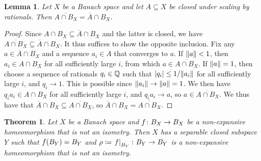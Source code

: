 \documentclass{amsart}
\newtheorem{theorem}{Theorem}
\newtheorem{lemma}{Lemma}
\theoremstyle{definition}
\newcommand{\clo}[1]{\overline{#1}}
\begin{document}
\begin{lemma}
    \label{rat-scaling}
    Let $X$ be a Banach space and let $A \subseteq X$ be closed under scaling by rationals. Then $\clo{A \cap B_X} = \clo{A} \cap B_X$.
\end{lemma}

\begin{proof}
Since $A \cap B_X \subseteq \clo{A} \cap B_X$ and the latter is closed, we
have $\clo{A \cap B_X} \subseteq \clo{A} \cap B_X$. It thus suffices to show
the opposite inclusion. Fix any $a \in \clo{A} \cap B_X$ and a sequence $a_i
\in A$ that converges to $a$. If $\norm{a} < 1$, then $a_i \in A \cap B_X$ for
all sufficiently large $i$, from which $a \in \clo{A \cap B_X}$. If $\norm{a} =
1$, then choose a sequence of rationals $q_i \in \mathbb{Q}$ such that $\abs{q_i} \leq 1/
\norm{a_i}$ for all sufficiently large $i$, and $q_i \to 1$. This is possible
since $\norm{a_i} \to \norm{a} = 1$. We then have $q_i a_i \in A \cap B_X$ for all
sufficiently large $i$, and $q_i a_i \to a$, so $a \in \clo{A \cap B_X}$. We thus
have that $\clo{A} \cap B_X \subseteq \clo{A \cap B_X}$, so $\clo{A} \cap B_X =
\clo{A \cap B_X}$.
\end{proof}

\newcommand\restr[2]{\ensuremath{\left.#1\right|_{#2}}}

\begin{theorem}
    Let $X$ be a Banach space and $f \colon  B_X \to B_X$ be a non-expansive homeomorphism that is not an isometry. Then $X$ has a separable closed subspace $Y$ such that $f(B_Y) = B_Y$ and $\rho \coloneqq \restr{\lip}{B_Y}  \colon  B_Y \to B_Y$ is a non-expansive homeomorphism that is not an isometry.
\end{theorem}
\end{document}
